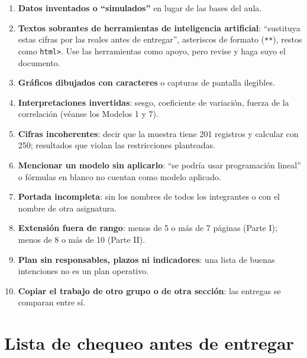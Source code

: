 \begin{cajaAlerta}
\begin{enumerate}[leftmargin=1.4em,itemsep=2pt]
\item \textbf{Datos inventados o ``simulados''} en lugar de las bases del aula.
\item \textbf{Textos sobrantes de herramientas de inteligencia artificial}: ``sustituya estas cifras por las reales antes de entregar'', asteriscos de formato (\texttt{**}), restos como \texttt{html>}. Use las herramientas como apoyo, pero revise y haga suyo el documento.
\item \textbf{Gráficos dibujados con caracteres} o capturas de pantalla ilegibles.
\item \textbf{Interpretaciones invertidas}: sesgo, coeficiente de variación, fuerza de la correlación (véanse los Modelos 1 y 7).
\item \textbf{Cifras incoherentes}: decir que la muestra tiene 201 registros y calcular con 250; resultados que violan las restricciones planteadas.
\item \textbf{Mencionar un modelo sin aplicarlo}: ``se podría usar programación lineal'' o fórmulas en blanco no cuentan como modelo aplicado.
\item \textbf{Portada incompleta}: sin los nombres de todos los integrantes o con el nombre de otra asignatura.
\item \textbf{Extensión fuera de rango}: menos de 5 o más de 7 páginas (Parte I); menos de 8 o más de 10 (Parte II).
\item \textbf{Plan sin responsables, plazos ni indicadores}: una lista de buenas intenciones no es un plan operativo.
\item \textbf{Copiar el trabajo de otro grupo o de otra sección}: las entregas se comparan entre sí.
\end{enumerate}
\end{cajaAlerta}

\section{Lista de chequeo antes de entregar}

